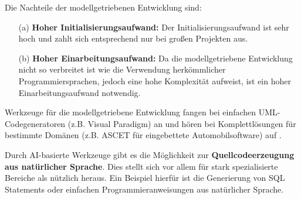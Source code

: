Die Nachteile der modellgetriebenen Entwicklung sind:
\begin{itemize}
	\item[(a)] \textbf{Hoher Initialisierungsaufwand:}
	Der Initialisierungsaufwand ist sehr hoch und zahlt sich entsprechend nur bei großen Projekten aus.
	\item[(b)] \textbf{Hoher Einarbeitungsaufwand:}
	Da die modellgetriebene Entwicklung nicht so verbreitet ist wie die Verwendung herkömmlicher Programmiersprachen, jedoch eine hohe Komplexität aufweist, ist ein hoher Einarbeitungsaufwand notwendig.
\end{itemize}

Werkzeuge für die modellgetriebene Entwicklung fangen bei einfachen UML-Codegeneratoren (z.B. Visual Paradigm) an und hören bei Komplettlösungen für bestimmte Domänen (z.B. ASCET für eingebettete Automobilsoftware) auf \cite{StahlVoelterEtAl07}.

Durch AI-basierte Werkzeuge gibt es die Möglichkeit zur \textbf{Quellcodeerzeugung aus natürlicher Sprache}. Dies stellt sich vor allem für stark spezialisierte Bereiche als nützlich heraus. Ein Beispiel hierfür ist die Generierung von SQL Statements oder einfachen Programmieranweisungen aus natürlicher Sprache. 

